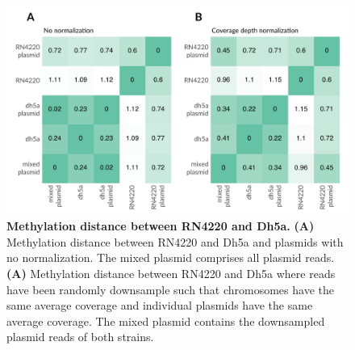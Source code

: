 \begin{figure}[!hb]
\centering
\includegraphics[width = 1\linewidth,keepaspectratio]{figure/bheatmaps.pdf}
\caption[Methylation distance between RN4220 and Dh5a]{{\bf Methylation distance between RN4220 and Dh5a.} {\bf (A)} Methylation distance between RN4220 and Dh5a and plasmids with no normalization. The mixed plasmid comprises all plasmid reads. {\bf (A)} Methylation distance between RN4220 and Dh5a where reads have been randomly downsample such that chromosomes have the same average coverage and individual plasmids have the same average coverage. The mixed plasmid contains the downsampled plasmid reads of both strains. }
\label{fig:bheatmaps}
\end{figure}


